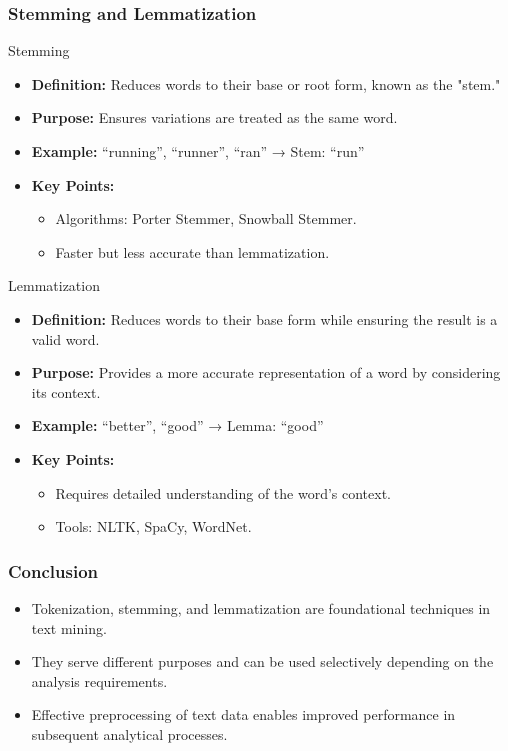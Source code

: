 \documentclass[aspectratio=169]{beamer}
\begin{document}
\begin{frame}[fragile]
    \frametitle{Stemming and Lemmatization}
    \begin{block}{Stemming}
        \begin{itemize}
            \item \textbf{Definition:} Reduces words to their base or root form, known as the "stem."
            \item \textbf{Purpose:} Ensures variations are treated as the same word.
            \item \textbf{Example:} “running”, “runner”, “ran” → Stem: “run”
            \item \textbf{Key Points:} 
                \begin{itemize}
                    \item Algorithms: Porter Stemmer, Snowball Stemmer.
                    \item Faster but less accurate than lemmatization.
                \end{itemize}
        \end{itemize}
    \end{block}

    \begin{block}{Lemmatization}
        \begin{itemize}
            \item \textbf{Definition:} Reduces words to their base form while ensuring the result is a valid word.
            \item \textbf{Purpose:} Provides a more accurate representation of a word by considering its context.
            \item \textbf{Example:} “better”, “good” → Lemma: “good”
            \item \textbf{Key Points:} 
                \begin{itemize}
                    \item Requires detailed understanding of the word’s context.
                    \item Tools: NLTK, SpaCy, WordNet.
                \end{itemize}
        \end{itemize}
    \end{block}
\end{frame}

\begin{frame}[fragile]
    \frametitle{Conclusion}
    \begin{itemize}
        \item Tokenization, stemming, and lemmatization are foundational techniques in text mining.
        \item They serve different purposes and can be used selectively depending on the analysis requirements.
        \item Effective preprocessing of text data enables improved performance in subsequent analytical processes.
    \end{itemize}
\end{frame}
\end{document}
